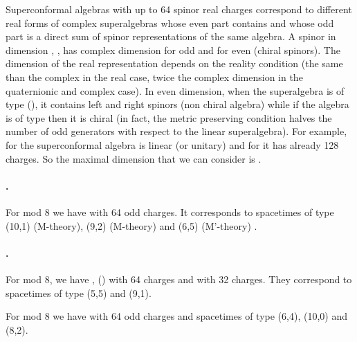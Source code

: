 \documentclass[a4paper,12pt]{article}
\begin{document}
Superconformal algebras with up to 64 spinor real charges
correspond to different real forms of complex superalgebras whose
even part contains \coordHE{} and whose odd part is a direct
sum of spinor representations of the same algebra. A spinor in
dimension \coordHE{}, \coordHE{}, has complex dimension  \coordHE{} for
\coordHE{} odd and \coordHE{} for \coordHE{} even (chiral spinors). The dimension
of the real representation depends on  the reality condition (the
same than the complex in the real case, twice the complex
dimension in the quaternionic and complex case).  In even
dimension, when the superalgebra is of type \coordHE{}
(\coordHE{}), it contains left and right spinors (non chiral
algebra) while if the algebra is of type \coordHE{} then it is
chiral (in fact, the metric preserving condition halves the number
of odd generators with respect to the linear superalgebra). For
example, for \coordHE{} the superconformal algebra is linear (or
unitary) and for \coordHE{} it has already 128 charges. So the maximal
dimension that we can consider is \coordHE{}.



\paragraph{\coordHE{}.} For \coordHE{} mod 8 we have \coordHE{} with 64 odd charges. It
corresponds to spacetimes of type (10,1) (M-theory), (9,2)
(M\myHighlight{$^*$}\coordHE{}-theory) and (6,5) (M'-theory) \cite{hu}.

\paragraph{\coordHE{}.}
For \coordHE{} mod 8, we have \coordHE{}, (\coordHE{}) with 64
charges and  \coordHE{} with 32 charges. They correspond to
spacetimes of type (5,5) and (9,1).

\smallskip

\noindent For \coordHE{} mod 8  we have \coordHE{} with 64
odd charges and spacetimes of type (6,4), (10,0) and (8,2).
\end{document}
